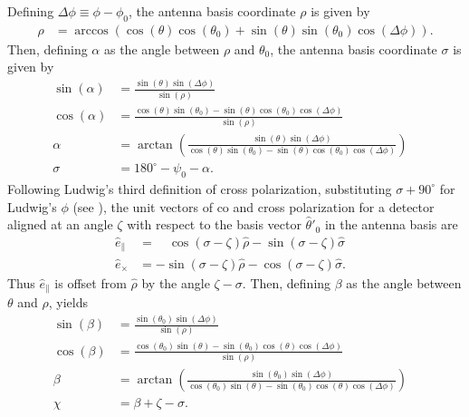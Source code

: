\documentclass[a4paper,11pt]{article}
\newcommand{\co}{\mathbin{\|}}
\newcommand{\cx}{\mathbin{\times}}
\begin{document}
Defining $\Delta \phi \equiv \phi - \phi_0$, the antenna basis coordinate $\rho$ is given by
%
\begin{align}
\rho  &= \arccos( \cos(\theta) \cos(\theta_0) + \sin(\theta) \sin(\theta_0) \cos(\Delta \phi) ).
\end{align}
%
Then, defining $\alpha$ as the angle between $\rho$ and $\theta_0$, the antenna basis coordinate $\sigma$ is given by
%
\begin{align}
\sin(\alpha) &= \frac{\sin(\theta) \sin(\Delta \phi)}{\sin(\rho)} & \\
\cos(\alpha) &= \frac{\cos(\theta) \sin(\theta_0) - \sin(\theta) \cos(\theta_0) \cos(\Delta \phi)}{\sin(\rho)} & \\ 
\alpha       &=  \arctan \left(\frac{\sin(\theta) \sin(\Delta \phi)}{\cos(\theta) \sin(\theta_0) - \sin(\theta) \cos(\theta_0) \cos(\Delta \phi)} \right)  & \\
\sigma &= 180^{\circ} - \psi_0 - \alpha. &
\end{align}
%
Following Ludwig's third definition of cross polarization, substituting $\sigma + 90^{\circ}$ for Ludwig's $\phi$ (see \cite{1140406}), the unit vectors of co and cross polarization for a detector aligned at an angle $\zeta$ with respect to the basis vector $\hat{\theta}'_0$ in the antenna basis are
%
\begin{align}
\hat{e}_{\co} &=  \quad \cos(\sigma - \zeta) \hat{\rho} - \sin(\sigma - \zeta) \hat{\sigma} & \\
\hat{e}_{\cx} &=      - \sin(\sigma - \zeta) \hat{\rho} - \cos(\sigma - \zeta) \hat{\sigma}. & 
\end{align}
%
Thus $\hat{e}_{\co}$ is offset from $\hat{\rho}$ by the angle $\zeta - \sigma$. Then, defining $\beta$ as the angle between $\theta$ and $\rho$, yields
%
\begin{align}
\sin(\beta) &= \frac{\sin(\theta_0) \sin(\Delta \phi)}{\sin(\rho)} & \\
\cos(\beta) &= \frac{\cos(\theta_0) \sin(\theta) - \sin(\theta_0) \cos(\theta) \cos(\Delta \phi)}{\sin(\rho)} & \\ 
\beta       &=  \arctan \left(\frac{\sin(\theta_0) \sin(\Delta \phi)}{\cos(\theta_0) \sin(\theta) - \sin(\theta_0) \cos(\theta) \cos(\Delta \phi)} \right)  & \\
\chi &= \beta + \zeta - \sigma. &
\end{align}
\end{document}
